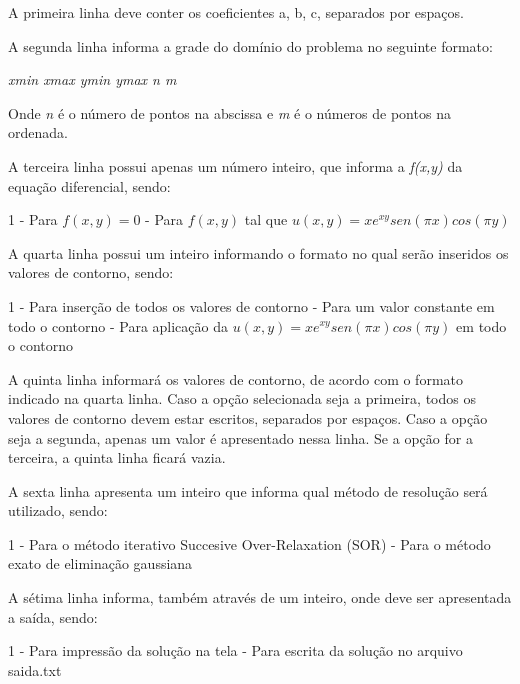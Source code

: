 \documentclass[
	article,			%
	11pt,				%
	oneside,			%
	a4paper,			%
	english,			%
	brazil,				%
	sumario=tradicional
	]{abntex2}
\begin{document}
A primeira linha deve conter os coeficientes a, b, c, separados por espaços.

A segunda linha informa a grade do domínio do problema no seguinte formato:
\begin{center} \emph{xmin xmax ymin ymax n m} \end{center}
Onde \emph{n} é o número de pontos na abscissa e \emph{m} é o números de pontos na ordenada.

A terceira linha possui apenas um número inteiro, que informa a \emph{f(x,y)} da equação diferencial, sendo:
\begin{flushleft} 
1 - Para $ f(x,y) = 0 $  - Para $ f(x,y) $ tal que $ u(x,y) = x e^{xy} sen(\pi x) cos(\pi y) $ 
\end{flushleft}

A quarta linha possui um inteiro informando o formato no qual serão inseridos os valores de contorno, sendo:
\begin{flushleft}
1 - Para inserção de todos os valores de contorno  - Para um valor constante em todo o contorno  - Para aplicação da $ u(x,y) = x e^{xy} sen(\pi x) cos(\pi y) $ em todo o contorno
\end{flushleft}

A quinta linha informará os valores de contorno, de acordo com o formato indicado na quarta linha. Caso a opção selecionada
seja a primeira, todos os valores de contorno devem estar escritos, separados por espaços. Caso a opção seja a segunda, apenas
um valor é apresentado nessa linha. Se a opção for a terceira, a quinta linha ficará vazia.

A sexta linha apresenta um inteiro que informa qual método de resolução será utilizado, sendo:
\begin{flushleft}
1 - Para o método iterativo Succesive Over-Relaxation (SOR)  - Para o método exato de eliminação gaussiana
\end{flushleft}

A sétima linha informa, também através de um inteiro, onde deve ser apresentada a saída, sendo:
\begin{flushleft}
1 - Para impressão da solução na tela  - Para escrita da solução no arquivo saida.txt
\end{flushleft}
\end{document}
